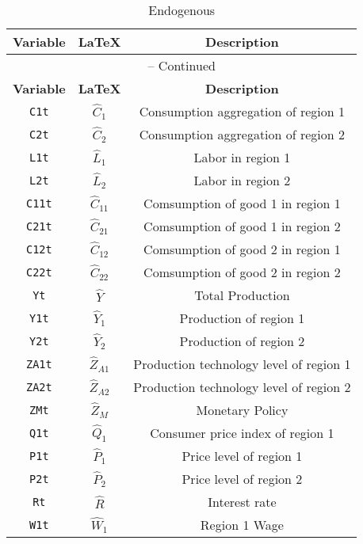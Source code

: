 \begin{center}
\begin{longtable}{ccc}
\caption{Endogenous}\\%
\hline%
\multicolumn{1}{c}{\textbf{Variable}} &
\multicolumn{1}{c}{\textbf{\LaTeX}} &
\multicolumn{1}{c}{\textbf{Description}}\\%
\hline\hline%
\endfirsthead
\multicolumn{3}{c}{{\tablename} \thetable{} -- Continued}\\%
\hline%
\multicolumn{1}{c}{\textbf{Variable}} &
\multicolumn{1}{c}{\textbf{\LaTeX}} &
\multicolumn{1}{c}{\textbf{Description}}\\%
\hline\hline%
\endhead
\texttt{C1t} & ${\hat{C}_{1}}$ & Consumption aggregation of region 1\\
\texttt{C2t} & ${\hat{C}_{2}}$ & Consumption aggregation of region 2\\
\texttt{L1t} & ${\hat{L}_{1}}$ & Labor in region 1\\
\texttt{L2t} & ${\hat{L}_{2}}$ & Labor in region 2\\
\texttt{C11t} & ${\hat{C}_{1 1}}$ & Comsumption of good 1 in region 1\\
\texttt{C21t} & ${\hat{C}_{2 1}}$ & Comsumption of good 1 in region 2\\
\texttt{C12t} & ${\hat{C}_{1 2}}$ & Comsumption of good 2 in region 1\\
\texttt{C22t} & ${\hat{C}_{2 2}}$ & Comsumption of good 2 in region 2\\
\texttt{Yt} & ${\hat{Y}}$ & Total Production\\
\texttt{Y1t} & ${\hat{Y}_{1}}$ & Production of region 1\\
\texttt{Y2t} & ${\hat{Y}_{2}}$ & Production of region 2\\
\texttt{ZA1t} & ${\hat{Z}_{A1}}$ & Production technology level of region 1\\
\texttt{ZA2t} & ${\hat{Z}_{A2}}$ & Production technology level of region 2\\
\texttt{ZMt} & ${\hat{Z}_M}$ & Monetary Policy\\
\texttt{Q1t} & ${\hat{Q}_{1}}$ & Consumer price index of region 1\\
\texttt{P1t} & ${\hat{P}_{1}}$ & Price level of region 1\\
\texttt{P2t} & ${\hat{P}_{2}}$ & Price level of region 2\\
\texttt{Rt} & ${\hat{R}}$ & Interest rate\\
\texttt{W1t} & ${\hat{W}_{1}}$ & Region 1 Wage\\

\end{longtable}
\end{center}
